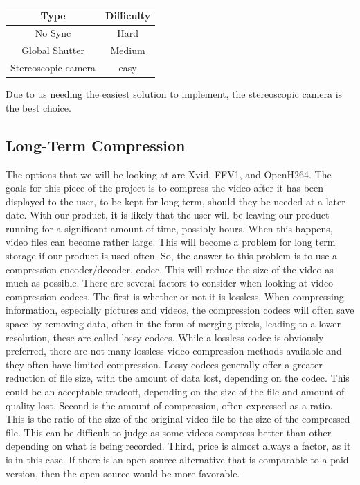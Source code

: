 \documentclass[onecolumn, draftclsnofoot,10pt, compsoc]{IEEEtran}
\begin{document}
\begin{center}
	\begin{tabular}{|c|c|}
		\hline
		\textbf{Type} & \textbf{Difficulty} \\
		\hline
		No Sync & Hard \\
		\hline
		Global Shutter & Medium\\
		\hline
		Stereoscopic camera & easy \\
		\hline
		
	\end{tabular}
\end{center}


Due to us needing the easiest solution to implement, the stereoscopic camera is the best choice.


\newpage
\subsection{Long-Term Compression} %

The options that we will be looking at are Xvid, FFV1, and OpenH264.
The goals for this piece of the project is to compress the video after it has been displayed to the user, to be kept for long term, should they be needed at a later date.
With our product, it is likely that the user will be leaving our product running for a significant amount of time, possibly hours.
When this happens, video files can become rather large.
This will become a problem for long term storage if our product is used often.
So, the answer to this problem is to use a compression encoder/decoder, codec.
This will reduce the size of the video as much as possible.
There are several factors to consider when looking at video compression codecs.
The first is whether or not it is lossless.
When compressing information, especially pictures and videos, the compression codecs will often save space by removing data, often in the form of merging pixels, leading to a lower resolution, these are called lossy codecs.
While a lossless codec is obviously preferred, there are not many lossless video compression methods available and they often have limited compression.
Lossy codecs generally offer a greater reduction of file size, with the amount of data lost, depending on the codec.
This could be an acceptable tradeoff, depending on the size of the file and amount of quality lost.
Second is the amount of compression, often expressed as a ratio.
This is the ratio of the size of the original video file to the size of the compressed file.
This can be difficult to judge as some videos compress better than other depending on what is being recorded.
Third, price is almost always a factor, as it is in this case.
If there is an open source alternative that is comparable to a paid version, then the open source would be more favorable.
\end{document}
